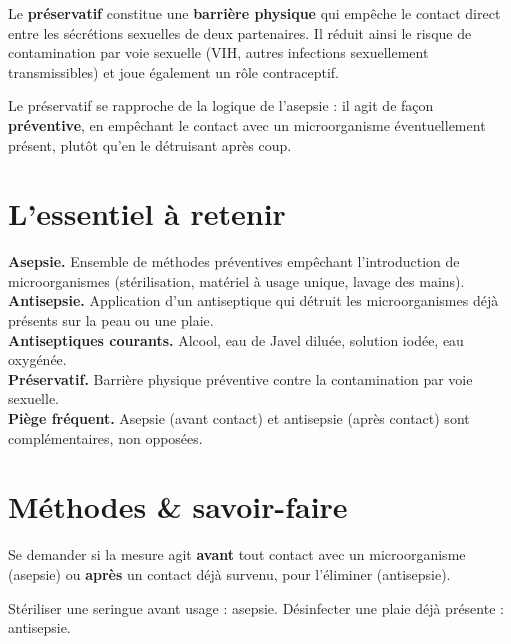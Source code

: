 \begin{propriete}
Le \textbf{préservatif} constitue une \textbf{barrière physique} qui empêche le
contact direct entre les sécrétions sexuelles de deux partenaires. Il réduit ainsi le
risque de contamination par voie sexuelle (VIH, autres infections sexuellement
transmissibles) et joue également un rôle contraceptif.
\end{propriete}

\begin{remarque}
Le préservatif se rapproche de la logique de l'asepsie : il agit de façon
\textbf{préventive}, en empêchant le contact avec un microorganisme éventuellement
présent, plutôt qu'en le détruisant après coup.
\end{remarque}

\section{L'essentiel à retenir}

\begin{synthese}
\textbf{Asepsie.} Ensemble de méthodes préventives empêchant l'introduction de
microorganismes (stérilisation, matériel à usage unique, lavage des mains).\\[4pt]
\textbf{Antisepsie.} Application d'un antiseptique qui détruit les microorganismes
déjà présents sur la peau ou une plaie.\\[4pt]
\textbf{Antiseptiques courants.} Alcool, eau de Javel diluée, solution iodée, eau
oxygénée.\\[4pt]
\textbf{Préservatif.} Barrière physique préventive contre la contamination par voie
sexuelle.\\[4pt]
\textbf{Piège fréquent.} Asepsie (avant contact) et antisepsie (après contact) sont
complémentaires, non opposées.
\end{synthese}

\section{Méthodes \& savoir-faire}

Se demander si la mesure agit \textbf{avant} tout contact avec un microorganisme
(asepsie) ou \textbf{après} un contact déjà survenu, pour l'éliminer (antisepsie).
\begin{exemple}
Stériliser une seringue avant usage : asepsie. Désinfecter une plaie déjà présente :
antisepsie.
\end{exemple}

